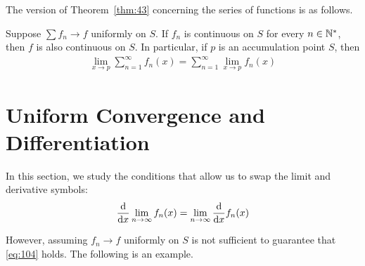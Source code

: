 \documentclass[thmcnt=section, 12pt]{my-elegantbook}
\begin{document}

The version of Theorem~\ref{thm:43} concerning the series of functions is as follows.

\begin{theorem} \label{thm:65}
    Suppose $\sum f_n \to f$ uniformly on $S$. If $f_n$ is continuous on $S$ for every $n \in \mathbb{N}^\ast$, then $f$ is also continuous on $S$. In particular, if $p$ is an accumulation point $S$, then 
    \begin{align*}
        \lim_{x \to p} \sum_{n=1}^\infty f_n(x)
        = \sum_{n=1}^\infty \lim_{x \to p} f_n(x)
    \end{align*}
\end{theorem}


\section{Uniform Convergence and Differentiation}

In this section, we study the conditions that allow us to swap the limit and derivative symbols:
\begin{align}
    \odvs{\lim_{n \to \infty} f_n(x)}{x}
    = \lim_{n \to \infty} \odvs{f_n(x)}{x}
    \label{eq:104}
\end{align}

However, assuming $f_n \to f$ uniformly on $S$ is not sufficient to guarantee that \eqref{eq:104} holds. The following is an example.
\end{document}
